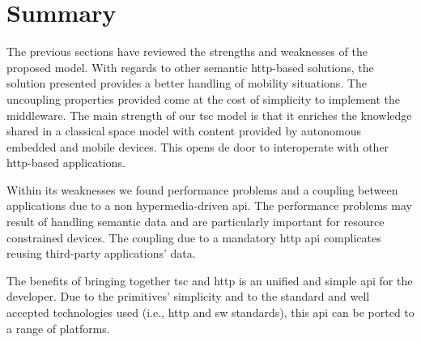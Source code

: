 \section{Summary}

The previous sections have reviewed the strengths and weaknesses of the proposed model.
With regards to other semantic \ac{http}-based solutions, the solution presented provides a better handling of mobility situations. %
The uncoupling properties provided come at the cost of simplicity to implement the middleware.
The main strength of our \ac{tsc} model is that it enriches the knowledge shared in a classical space model with content provided by autonomous embedded and mobile devices.
This opens de door to interoperate with other \ac{http}-based applications.


Within its weaknesses we found performance problems and a coupling between applications due to a non hypermedia-driven \ac{api}.
The performance problems may result of handling semantic data and are particularly important for resource constrained devices.
The coupling due to a mandatory \ac{http} \ac{api} complicates reusing third-party applications' data.


The benefits of bringing together \ac{tsc} and \ac{http} is an unified and simple \ac{api} for the developer. %
Due to the primitives' simplicity and to the standard and well accepted technologies used (i.e., \ac{http} and \ac{sw} standards), this \ac{api} can be ported to a range of platforms.